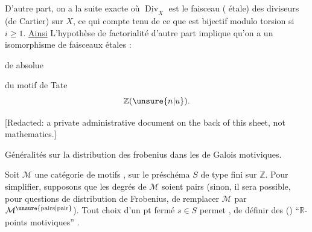 D'autre part, on a  la suite exacte
où $\underline{\operatorname{Div}}_X$ est le faisceau ( étale) des diviseurs (de Cartier) sur $X$, ce qui   compte tenu de ce que
est bijectif modulo torsion  si $i\geq 1$. \uline{Ainsi}
 L'hypothèse de factorialité d'autre part implique  qu'on a un isomorphisme de faisceaux étales :



 de  absolue

du motif de Tate
\[
\mathbb{Z}(\unsure{n|u}).
\]


[Redacted: a private administrative document on the back of this sheet, not mathematics.]


Généralités 
sur la distribution des
frobenius dans les 
de Galois motiviques.



Soit $\mathcal M$ une catégorie de motifs ,  sur le préschéma $S$ de type fini sur $\mathbb Z$. Pour simplifier, supposons que les degrés de $\mathcal M$ soient pairs (sinon, il sera possible, pour   questions de distribution de Frobenius, de remplacer $\mathcal M$ par $\mathcal M^{\unsure{\mathrm{pairs}|\mathrm{pair}}}$). Tout choix d'un pt fermé $s\in S$ permet , de définir des () ``$\mathbb R$-points motiviques'' .

